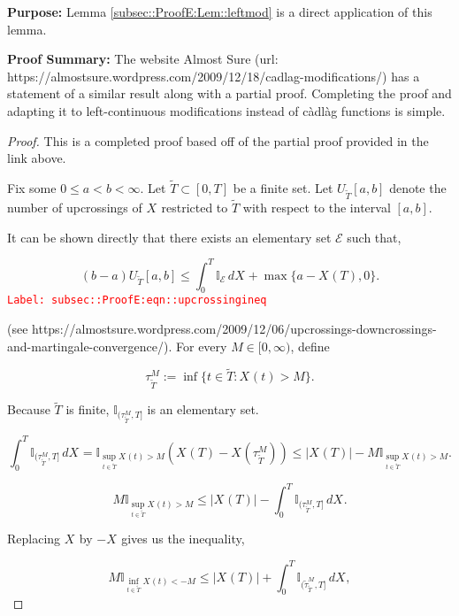 \documentclass[12pt]{article}
\newcommand{\mb}{\mathbb}
\newcommand{\mc}{\mathcal}
\newcommand{\tr}{\textcolor{red}}
\newcommand{\labe}[1]{\tr{\texttt{Label: #1}}}
\newcommand{\purpose}{\textbf{Purpose: }}
\newcommand{\pfsum}{\textbf{Proof Summary: }}
\newcommand{\ind}{\hspace{24pt}}
\newcommand{\T}{T}								%
\renewcommand{\t}{t}							%
\newcommand{\X}{X}								%
\newcommand{\cind}[1]{_{#1}}					%
\newcommand{\tp}[1]{(#1)}						%
\newcommand{\tip}[1]{#1}						%
\newcommand{\alt}[1]{\widetilde{#1}}			%
\newcommand{\rt}{\tau}							%
\newcommand{\evnt}{\mc{E}}						%
\newcommand{\Tset}{\alt{T}}						%
\newcommand{\upcrs}{U}							%
\newcommand{\gid}[1]{^{#1}}						%
\newcommand{\gidd}[1]{_{#1}}					%
\begin{document}
\purpose Lemma \ref{subsec::ProofE:Lem::leftmod} is a direct application of this lemma.

\pfsum The website Almost Sure (url: https://almostsure.wordpress.com/2009/12/18/cadlag-modifications/) has a statement of a similar result along with a partial proof. Completing the proof and adapting it to left-continuous modifications instead of c\`adl\`ag functions is simple.

\begin{proof}
This is a completed proof based off of the partial proof provided in the link above.

\ind Fix some \(0\leq a < b < \infty\). Let \(\Tset \subset [0,\T]\) be a finite set. Let \(\upcrs\gidd{\alt{\T}}[a,b]\) denote the number of upcrossings of \(\X\cind{}\tip{}\) restricted to \(\alt{\T}\) with respect to the interval \([a,b]\).

\ind It can be shown directly that there exists an elementary set \(\evnt\) such that,

\begin{equation}
(b-a)\upcrs\gidd{\Tset}[a,b] \leq \int_0^\T \mb{I}_{\evnt}\,d\X\cind{}\tip{} + \max\{a - \X\cind{}\tp{\T},0\}.
\label{subsec::ProofE:eqn::upcrossingineq}
\end{equation}
\labe{subsec::ProofE:eqn::upcrossingineq}

(see https://almostsure.wordpress.com/2009/12/06/upcrossings-downcrossings-and-martingale-convergence/). For every \(M \in [0,\infty)\), define

\[\rt\gid{M}\gidd{\Tset} := \inf\{\t\in \alt{\T}: \X\cind{}\tp{\t} > M\}.\]

Because \(\Tset\) is finite, \(\mb{I}_{(\rt\gid{M}\gidd{\Tset},\T]}\) is an elementary set.

\[\int_0^\T \mb{I}_{(\rt\gid{M}\gidd{\Tset},\T]}\,d\X\cind{}\tip{} = \mb{I}_{\sup_{\t\in \Tset} \X\cind{}\tp{\t} > M}(\X\cind{}\tp{\T} - \X\cind{}\tp{\rt\gid{M}\gidd{\Tset}}) \leq |\X\cind{}\tp{\T}| - M\mb{I}_{\sup_{\t \in \Tset} \X\cind{}\tp{\t} > M}.\]

\[M\mb{I}_{\sup_{\t\in\Tset} \X\cind{}\tp{\t} > M} \leq |\X\cind{}\tp{\T}| - \int_0^T \mb{I}_{(\rt\gid{M}\gidd{\Tset},\T]}\,d\X\cind{}\tip{}.\]


Replacing \(\X\cind{}\tip{}\) by \(-\X\cind{}\tip{}\) gives us the inequality,

\[M\mb{I}_{\inf_{\t\in\Tset} \X\cind{}\tp{\t} < -M} \leq |\X\cind{}\tp{\T}| + \int_0^T \mb{I}_{(\alt{\rt}\gid{M}\gidd{\Tset},\T]}\,d\X\cind{}\tip{},\]


\end{proof}
\end{document}
